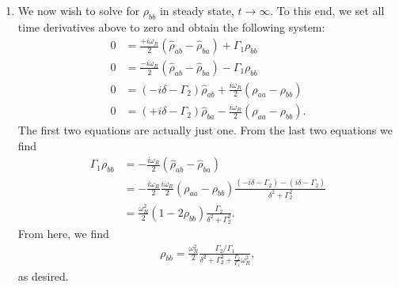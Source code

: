\documentclass{article}
\theoremstyle{definition}
\newcommand{\f}[2]{\frac{#1}{#2}}
\newcommand{\lp}{\left(}
\newcommand{\rp}{\right)}
\begin{document}
\begin{enumerate}[label=(\alph*)]
\begin{enumerate}[label=(\roman*)]
		\item We now wish to solve for $\rho_{bb}$ in steady state, $t\to \infty$. To this end, we set all time derivatives above to zero and obtain the following system:
		\begin{align*}
		0 & = \f{+i\omega_R}{2} \lp \hat{\rho}_{ab} - \hat{\rho}_{ba} \rp + \Gamma_1 \rho_{bb}\\
		0 & = \f{-i\omega_R}{2}\lp \hat{\rho}_{ab} - \hat{\rho}_{ba} \rp - \Gamma_1 \rho_{bb}\\
		0 &= (-i\delta - \Gamma_2)\hat{\rho}_{ab} + \f{i\omega_R}{2}(\rho_{aa} - \rho_{bb})\\
		0
		&= (+i\delta - \Gamma_2 ) \hat{\rho}_{ba} - \f{i\omega_R }{2} (\rho_{aa} - \rho_{bb}).
		\end{align*}
		The first two equations are actually just one. From the last two equations we find 
		\begin{align*}
		\Gamma_1 \rho_{bb} 
		&= -\f{i\omega_R}{2}(\hat{\rho}_{ab} - \hat{\rho}_{ba}) \\
		&= -\f{i\omega_R}{2} \f{i\omega_R}{2}(\rho_{aa} - \rho_{bb})\f{(-i\delta - \Gamma_2) - (i\delta - \Gamma_2)}{\delta^2 + \Gamma_2^2} \\
		&= \f{\omega_R^2}{2}(1-2\rho_{bb}) \f{\Gamma_2}{\delta^2 + \Gamma_2^2}.
		\end{align*}
		From here, we find 
		\begin{align*}
		\rho_{bb} = \f{\omega_R^2}{2}\f{\Gamma_2/\Gamma_1}{\delta^2 + \Gamma_2^2 + \f{\Gamma_2}{\Gamma_1}\omega_R^2},
		\end{align*}
		as desired. 
	\end{enumerate}
	

\end{enumerate}
\end{document}
